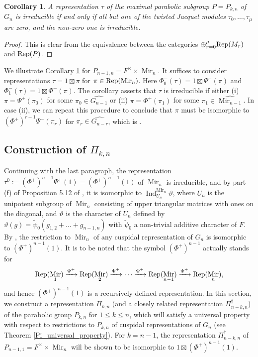 \documentclass[reqno]{amsart}
\newtheorem{corollary}[theorem]{Corollary}
\theoremstyle{definition}
\theoremstyle{remark}
\numberwithin{equation}{section}
\DeclareMathOperator{\Ind}{Ind}
\DeclareMathOperator{\Mir}{Mir}
\begin{document}
\begin{corollary} \label{Cat_equiv_corollary}
     A representation $\tau$ of the maximal parabolic subgroup $P=P_{k,n}$ of $G_n$ is irreducible if and only if all but one of the  twisted Jacquet modules $\tau_0, \dots, \tau_\mu$ are zero, and the non-zero one is irreducible.
 \end{corollary}
 \begin{proof}
This is clear from the  equivalence between the categories   $\oplus_{r=0}^\mu {\rm Rep}(M_r)$  and ${\rm Rep}(P)$.
\end{proof}
We  illustrate Corollary \ref{Cat_equiv_corollary}
for $P_{n-1,n} =F^\times \times \Mir_n$. It suffices to consider representations $\tau = 1 \boxtimes \pi$ for $\pi \in{\rm Rep}(\Mir_n)$. Here $\Phi_0^-(\tau)=1 \boxtimes \Psi^-(\pi)$ and $\Phi_1^-(\tau)=1 \boxtimes \Phi^-(\pi)$. The corollary asserts that $\tau$ is  irreducible if either (i) $\pi=\Psi^+(\pi_0)$ for some $ \pi_0\in \widehat{G_{n-1}}$ or (ii) $\pi=\Phi^+(\pi_1)$ for some $ \pi_1\in \widehat{\Mir_{n-1}}$. In case (ii), we can repeat this procedure  to conclude that $\pi$ must be isomorphic to $(\Phi^+)^{r-1} \Psi^+(\pi_r)$ for $\pi_r \in \widehat{G_{n-r}}$, which is \cite[Corollary 5.13]{BerZel[2]}.


 



\subsection{Construction of $\Pi_{k,n}$} \label{sec_Pi_construction}
Continuing with the last paragraph, the representation $\tau^0:=(\Phi^+)^{n-1} \Psi^+(1) = (\Phi^+)^{n-1}(1)$ of $\Mir_n$ is irreducible, and by part (f) of Proposition 5.12 of \cite{BerZel[2]}, it is isomorphic to $\Ind_{U_n}^{\Mir_n} \vartheta$, where $U_n$ is the  unipotent subgroup of $\Mir_n$ consisting of upper triangular matrices with ones on the diagonal, and $\vartheta$ is the character of $U_n$ defined by $\vartheta(g)=\tilde\psi_0(g_{1,2}+ \dots+g_{n-1,n})$ with $\tilde\psi_0$ a non-trivial additive character of $F$. By \cite[5.18]{BerZel[2]}, the restriction to $\Mir_n$ of any cuspidal representation of $G_n$ is isomorphic to $(\Phi^+)^{n-1}(1)$.
It is to be noted that the symbol $(\Phi^+)^{n-1}$ actually stands for 
\[ {\rm Rep}(\Mir_1) \xrightarrow{\Phi^+} {\rm Rep}(\Mir_2) \xrightarrow{\Phi^+} \cdots \xrightarrow{\Phi^+} {\rm Rep}(\Mir_{n-1}) \xrightarrow{\Phi^+} {\rm Rep}(\Mir_n),\]
and hence $(\Phi^+)^{n-1}(1)$ is a  recursively defined representation.
In this section, we  construct a representation $\Pi_{k,n}$ (and a closely related representation $\Pi_{n-k,n}^\dagger$) of the parabolic group $P_{k,n}$ for $1 \leq k \leq n$, which will satisfy a universal property with respect to restrictions to $P_{k,n}$ of cuspidal representations of $G_n$ (see Theorem \ref{Pi_universal_property}).
For $k=n-1$, the representation $\Pi_{n-k, n}^\dagger$ of $P_{n-1,1}=F^\times \times \Mir_n$ will be shown to be isomorphic to  $1 \boxtimes (\Phi^{+})^{n-1}(1)$.\\
\end{document}
